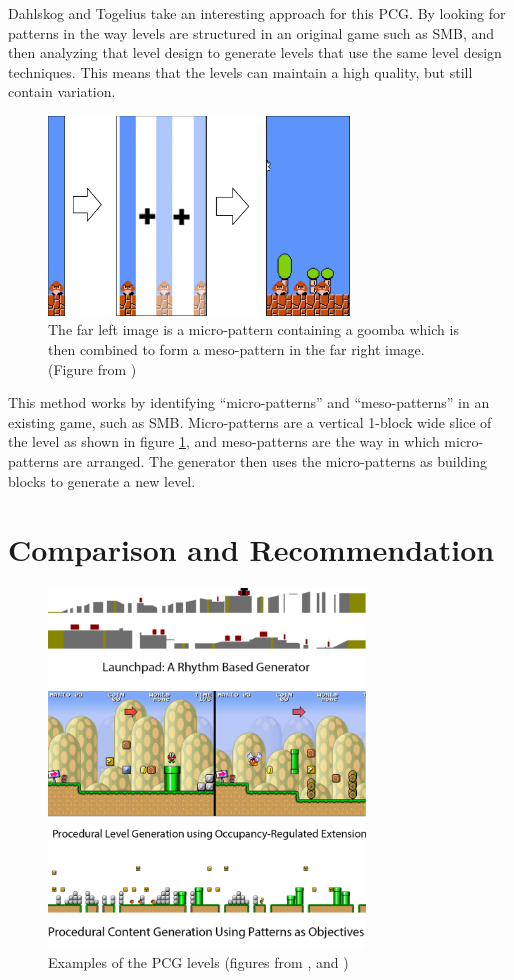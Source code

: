 \documentclass{scrartcl}
\begin{document}
Dahlskog and Togelius \cite{dahlskog2014} take an interesting approach for this PCG. By looking for patterns in the way levels are structured in an original game such as SMB, and then analyzing that level design to generate levels that use the same level design techniques. This means that the levels can maintain a high quality, but still contain variation.

\begin{figure}[h]
\includegraphics[width=8cm]{ocupancy1}
\centering
    \caption{The far left image is a micro-pattern containing a goomba which is then combined to form a meso-pattern in the far right image. (Figure from \cite{dahlskog2014})}
    \label{fig:ocupancyfig}
\end{figure}

This method works by identifying ``micro-patterns'' and ``meso-patterns'' in an existing game, such as SMB. Micro-patterns are a vertical 1-block wide slice of the level as shown in figure \ref{fig:ocupancyfig}, and meso-patterns are the way in which micro-patterns are arranged. The generator then uses the micro-patterns as building blocks to generate a new level.


\section{Comparison and Recommendation}

\begin{figure}[h]
\includegraphics[width=0.75\textwidth]{archtecture-images}
\centering
    \caption{Examples of the PCG levels (figures from \cite{smith2010}, \cite{mawhorter2010} and \cite{dahlskog2014})}
    \label{fig:PCG}
\end{figure}
\end{document}
